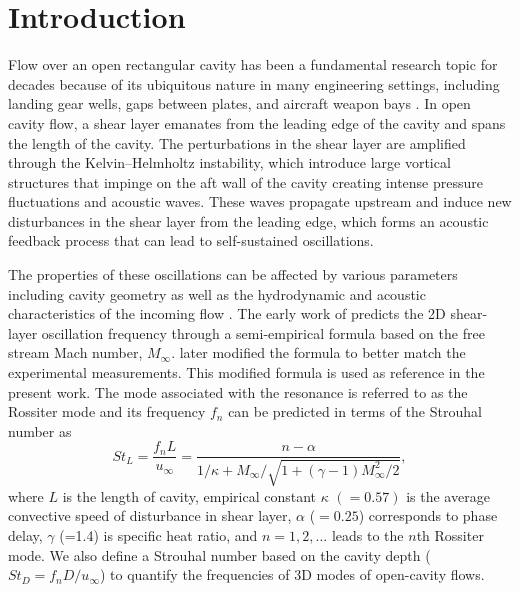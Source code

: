 \documentclass{jfm}
\begin{document}
\begin{keywords}
\end{keywords}





\section{Introduction}\label{sec:intro}

Flow over an open rectangular cavity has been a fundamental research topic for decades because of its ubiquitous nature in many engineering settings, including landing gear wells, gaps between plates, and aircraft weapon bays \citep{Cattafesta:PAS08,Lawson:PAS11}. In open cavity flow, a shear layer emanates from the leading edge of the cavity and spans the length of the cavity. The perturbations in the shear layer are amplified through the Kelvin--Helmholtz instability, which introduce large vortical structures that impinge on the aft wall of the cavity creating intense pressure fluctuations and acoustic waves. These waves propagate upstream and induce new disturbances in the shear layer from the leading edge, which forms an acoustic feedback process that can lead to self-sustained oscillations. 

The properties of these oscillations can be affected by various parameters including cavity geometry as well as the hydrodynamic and acoustic characteristics of the incoming flow \citep{Rockwell:JFE78,Lawson:PAS11, Rowley:JFM02, Sun:AIAA14}. The early work of \cite{Rossiter:ARCRM64} predicts the 2D shear-layer oscillation frequency through a semi-empirical formula based on the free stream Mach number, $M_\infty$. \cite{Heller:AIAA75} later modified the formula to better match the experimental measurements. This modified formula is used as reference in the present work. The mode associated with the resonance is referred to as the Rossiter mode and its frequency $f_n$ can be predicted in terms of the Strouhal number as
\begin{equation}
St_L=\frac{f_n L}{u_\infty}=\frac{n-\alpha}{1/\kappa+M_\infty/\sqrt{1+(\gamma-1)M_\infty^2/2}},
\label{eqRossiter}
\end{equation}
where $L$ is the length of cavity, empirical constant $\kappa$ $(= 0.57)$ is the average convective speed of disturbance in shear layer, $\alpha$ ($= 0.25$) \citep{Rossiter:ARCRM64} corresponds to phase delay, $\gamma$ (=1.4) is specific heat ratio, and $n=1,2, \dots $ leads to the $n$th Rossiter mode. We also define a Strouhal number based on the cavity depth ($St_D=f_n D/u_\infty$) to quantify the frequencies of 3D modes of open-cavity flows. 
\end{document}
